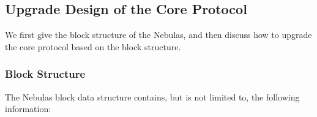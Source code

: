 \subsection{Upgrade Design of the Core Protocol}

We first give the block structure of the Nebulas, and then discuss how to upgrade the core protocol based on the block structure.


\subsubsection{Block Structure}

The Nebulas block data structure contains, but is not limited to, the following information:


